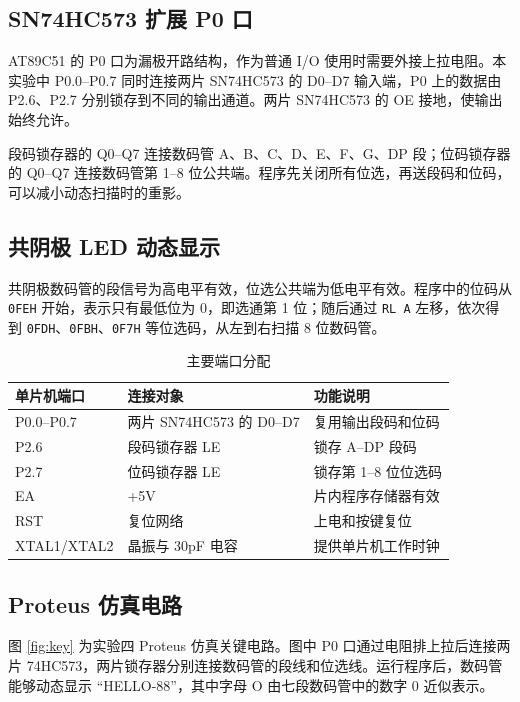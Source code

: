\subsection{SN74HC573 扩展 P0 口}
AT89C51 的 P0 口为漏极开路结构，作为普通 I/O 使用时需要外接上拉电阻。本实验中 P0.0--P0.7 同时连接两片 SN74HC573 的 D0--D7 输入端，P0 上的数据由 P2.6、P2.7 分别锁存到不同的输出通道。两片 SN74HC573 的 OE 接地，使输出始终允许。

段码锁存器的 Q0--Q7 连接数码管 A、B、C、D、E、F、G、DP 段；位码锁存器的 Q0--Q7 连接数码管第 1--8 位公共端。程序先关闭所有位选，再送段码和位码，可以减小动态扫描时的重影。

\subsection{共阴极 LED 动态显示}
共阴极数码管的段信号为高电平有效，位选公共端为低电平有效。程序中的位码从 \texttt{0FEH} 开始，表示只有最低位为 0，即选通第 1 位；随后通过 \texttt{RL A} 左移，依次得到 \texttt{0FDH}、\texttt{0FBH}、\texttt{0F7H} 等位选码，从左到右扫描 8 位数码管。

\begin{table}[H]
  \centering
  \caption{主要端口分配}
  \renewcommand{\arraystretch}{1.35}
  \begin{tabular}{p{}p{}p{}}
    \toprule
    单片机端口 & 连接对象 & 功能说明 \\
    \midrule
    P0.0--P0.7 & 两片 SN74HC573 的 D0--D7 & 复用输出段码和位码 \\
    P2.6 & 段码锁存器 LE & 锁存 A--DP 段码 \\
    P2.7 & 位码锁存器 LE & 锁存第 1--8 位位选码 \\
    EA & +5V & 片内程序存储器有效 \\
    RST & 复位网络 & 上电和按键复位 \\
    XTAL1/XTAL2 & 晶振与 30pF 电容 & 提供单片机工作时钟 \\
    \bottomrule
  \end{tabular}
\end{table}

\subsection{Proteus 仿真电路}
图 \ref{fig:key} 为实验四 Proteus 仿真关键电路。图中 P0 口通过电阻排上拉后连接两片 74HC573，两片锁存器分别连接数码管的段线和位选线。运行程序后，数码管能够动态显示 ``HELLO-88''，其中字母 O 由七段数码管中的数字 0 近似表示。

